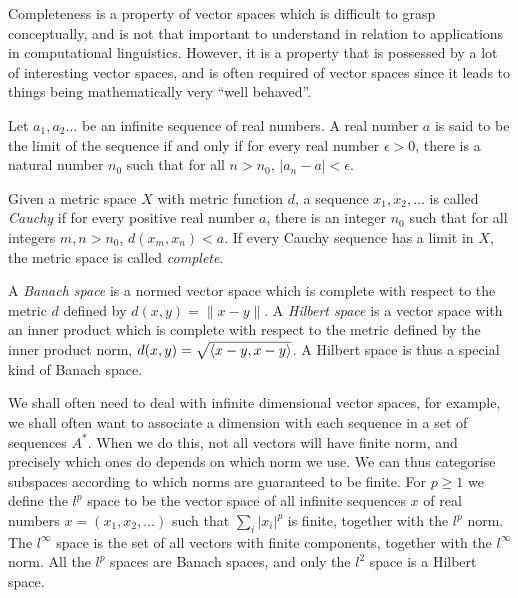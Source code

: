 \documentclass[12pt]{report}
\begin{document}
Completeness is a property of vector spaces which is difficult to grasp conceptually, and is not that important to understand in relation to applications in computational linguistics. However, it is a property that is possessed by a lot of interesting vector spaces, and is often required of vector spaces since it leads to things being mathematically very ``well behaved''.

\begin{defn}[Limit]
Let $a_1,a_2\ldots$ be an infinite sequence of real numbers. A real number $a$ is said to be the limit of the sequence if and only if for every real number $\epsilon > 0$, there is a natural number $n_0$ such that for all $n > n_0$, $|a_n - a| < \epsilon$.
\end{defn}

\begin{defn}[Completeness]
Given a metric space $X$ with metric function $d$, a sequence $x_1, x_2, \ldots$ is called \emph{Cauchy} if for every positive real number $a$, there is an integer $n_0$ such that for all integers $m,n > n_0$, $d(x_m,x_n) < a$. If every Cauchy sequence has a limit in $X$, the metric space is called \emph{complete}.

A \emph{Banach space} is a normed vector space which is complete with respect to the metric $d$ defined by $d(x,y) = \|x - y\|$. A \emph{Hilbert space} is a vector space with an inner product which is complete with respect to the metric defined by the inner product norm, $d(x,y) = \sqrt{\langle x-y, x-y \rangle}$. A Hilbert space is thus a special kind of Banach space.
\end{defn}

\begin{example}[$l^p$ Spaces]
We shall often need to deal with infinite dimensional vector spaces, for example, we shall often want to associate a dimension with each sequence in a set of sequences $A^*$. When we do this, not all vectors will have finite norm, and precisely which ones do depends on which norm we use. We can thus categorise subspaces according to which norms are guaranteed to be finite. For $p \ge 1$ we define the $l^p$ space to be the vector space of all infinite sequences $x$ of real numbers $x = (x_1,x_2,\ldots)$ such that $\sum_i |x_i|^p$ is finite, together with the $l^p$ norm. The $l^\infty$ space is the set of all vectors with finite components, together with the $l^\infty$ norm.
All the $l^p$ spaces are Banach spaces, and only the $l^2$ space is a Hilbert space.
\end{example}
\end{document}
